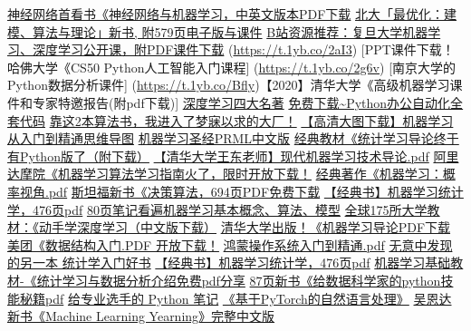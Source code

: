 \documentclass[
]{book}
\begin{document}
\href{https://mp.weixin.qq.com/s/wT3WybO2AlBfpWc0Tbn86Q}{神经网络首看书《神经网络与机器学习，中英文版本PDF下载}
\href{https://mp.weixin.qq.com/s/HLX8MCGwmcDOKImyEbQSyg}{北大「最优化：建模、算法与理论」新书, 附579页电子版与课件}
\href{https://t.1yb.co/1qCu}{B站资源推荐：复旦大学机器学习、深度学习公开课，附PDF课件下载}
(\url{https://t.1yb.co/2aI3}) {[}PPT课件下载！哈佛大学《CS50 Python人工智能入门课程{]}
(\url{https://t.1yb.co/2g6v}) {[}南京大学的Python数据分析课件{]}
(\url{https://t.1yb.co/Bfly})【2020】清华大学《高级机器学习课件和专家特邀报告(附pdf下载){]}
\href{http://mp.weixin.qq.com/s?__biz=MzA4MjYwMTc5Nw==\&mid=501452490\&idx=1\&sn=53548f92a09198ad00fb6bfc92f45bdb\&chksm=07941ce030e395f608815914ab4bdad4702e617d8fcde7ffcd568bd6bb4b743c1862b76bcb66\#rd}{深度学习四大名著}
\href{https://t.1yb.co/Bflc}{免费下载\textasciitilde Python办公自动化全套代码}
\href{https://t.1yb.co/9k6W}{靠这2本算法书，我进入了梦寐以求的大厂！}
\href{https://t.1yb.co/9Htp}{【高清大图下载】机器学习从入门到精通思维导图}
\href{https://t.1yb.co/ejr6}{机器学习圣经PRML中文版}
\href{https://t.1yb.co/aAPt}{经典教材《统计学习导论终于有Python版了（附下载）}
\href{https://t.1yb.co/eJAb}{【清华大学王东老师】现代机器学习技术导论.pdf}
\href{https://t.1yb.co/eJzT}{阿里达摩院《机器学习算法学习指南火了，限时开放下载！}
\href{https://t.1yb.co/upgG}{经典著作《机器学习：概率视角.pdf}
\href{https://t.1yb.co/ilMc}{斯坦福新书《决策算法，694页PDF免费下载}
\href{https://t.1yb.co/wiG3}{【经典书】机器学习统计学，476页pdf}
\href{https://t.1yb.co/wiH7}{80页笔记看遍机器学习基本概念、算法、模型}
\href{https://t.1yb.co/wiHf}{全球175所大学教材：《动手学深度学习（中文版下载）}
\href{https://t.1yb.co/xCWU}{清华大学出版！《机器学习导论PDF下载}
\href{https://t.1yb.co/wiHy}{美团《数据结构入门.PDF 开放下载！}
\href{https://t.1yb.co/wiHx}{鸿蒙操作系统入门到精通.pdf}
\href{https://t.1yb.co/xCWk}{无意中发现的另一本 统计学入门好书}
\href{https://t.1yb.co/xCWD}{【经典书】机器学习统计学，476页pdf}
\href{https://t.1yb.co/yaGN}{机器学习基础教材-《统计学习与数据分析介绍免费pdf分享}
\href{https://t.1yb.co/Bfkv}{87页新书《给数据科学家的python技能秘籍pdf}
\href{https://mp.weixin.qq.com/s/xf4TT-KSTVOejBqOvYzndA}{给专业选手的 Python 笔记}
\href{https://mp.weixin.qq.com/s?__biz=MzA4MjYwMTc5Nw==\&mid=2648931963\&idx=2\&sn=513b55ab2f6f2d03649d4a33b26b98e6\&chksm=8794ec51b0e3654722813be9617c3366ced68785651acf373d58202f368cde8affe51cd4d98a\&token=2004915986\&lang=en_US\#rd}{《基于PyTorch的自然语言处理》}
\href{https://mp.weixin.qq.com/s?__biz=MzA4MjYwMTc5Nw==\&mid=2648931759\&idx=1\&sn=3c8c08501d053f1d6828929ebf6221a8\&chksm=8794ef85b0e366936aa568030a40bfb77de1641f81029f41db38845b245a95df83991d7d5242\&token=2004915986\&lang=en_US\#rd}{吴恩达新书《Machine Learning Yearning》完整中文版}
\end{document}
